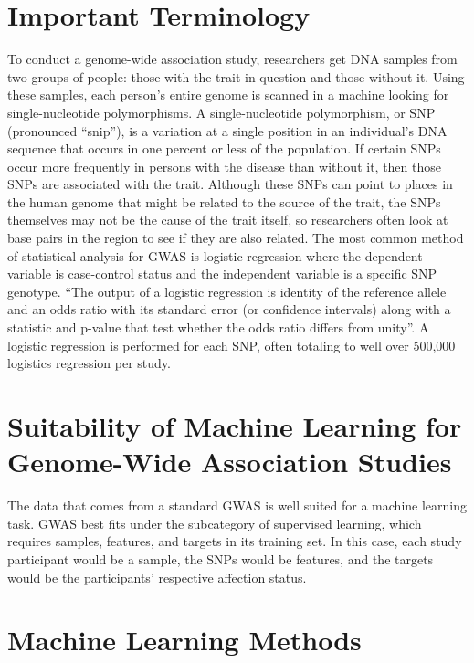 \documentclass[12pt]{report}
\begin{document}
\section{Important Terminology}
To conduct a genome-wide association study, researchers get DNA samples from two
groups of people: those with the trait in question and those without it. Using
these samples, each person's entire genome is scanned in a machine looking for
single-nucleotide polymorphisms. A single-nucleotide polymorphism, or SNP
(pronounced ``snip''), is a variation at a single position in an individual's
DNA sequence that occurs in one percent or less of the population. If certain
SNPs occur more frequently in persons with the disease than without it, then
those SNPs are associated with the trait. Although these SNPs can point to places
in the human genome that might be related to the source of the trait, the SNPs
themselves may not be the cause of the trait itself, so researchers often look
at base pairs in the region to see if they are also related\cite{NatureEducat}.
The most common method of statistical analysis for GWAS is logistic regression
where the dependent variable is case-control status and the independent variable
is a specific SNP genotype. ``The output of a logistic regression is identity of
the reference allele and an odds ratio with its standard error (or confidence
intervals) along with a statistic and p-value that test whether the odds ratio
differs from unity''\cite{Corvin2010}. A logistic regression is performed for
each SNP, often totaling to well over 500,000 logistics regression per study.

\section{Suitability of Machine Learning for Genome-Wide Association Studies}
The data that comes from a standard GWAS is well suited for a machine learning task.
GWAS best fits under the subcategory of supervised learning, which requires samples,
features, and targets in its training set. In this case, each study participant 
would be a sample, the SNPs would be features, and the targets would be the participants'
respective affection status.



\section{Machine Learning Methods}
\end{document}
